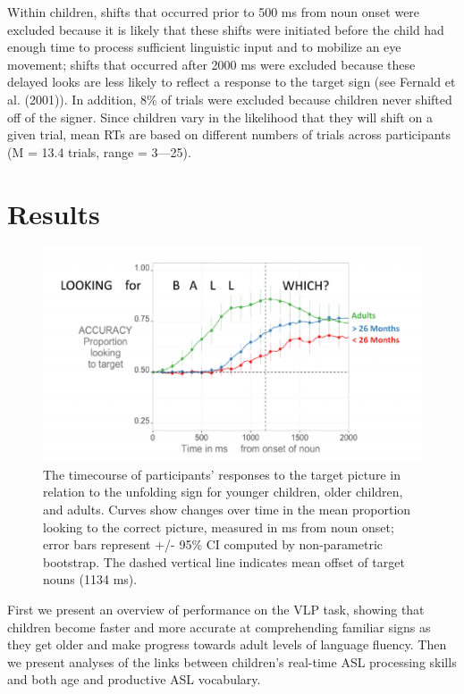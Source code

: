 \documentclass[12pt,]{article}
\begin{document}
Within children, shifts that occurred prior to 500 ms from noun onset
were excluded because it is likely that these shifts were initiated
before the child had enough time to process sufficient linguistic input
and to mobilize an eye movement; shifts that occurred after 2000 ms were
excluded because these delayed looks are less likely to reflect a
response to the target sign (see Fernald et al. (2001)). In addition,
8\% of trials were excluded because children never shifted off of the
signer. Since children vary in the likelihood that they will shift on a
given trial, mean RTs are based on different numbers of trials across
participants (M = 13.4 trials, range = 3---25).

\section{Results}\label{results}

\begin{figure}[htbp]
\centering
\includegraphics{Figs/profile plot png-1.pdf}
\caption{The timecourse of participants' responses to the target picture
in relation to the unfolding sign for younger children, older children,
and adults. Curves show changes over time in the mean proportion looking
to the correct picture, measured in ms from noun onset; error bars
represent +/- 95\% CI computed by non-parametric bootstrap. The dashed
vertical line indicates mean offset of target nouns (1134 ms).}
\end{figure}

First we present an overview of performance on the VLP task, showing
that children become faster and more accurate at comprehending familiar
signs as they get older and make progress towards adult levels of
language fluency. Then we present analyses of the links between
children's real-time ASL processing skills and both age and productive
ASL vocabulary.
\end{document}
